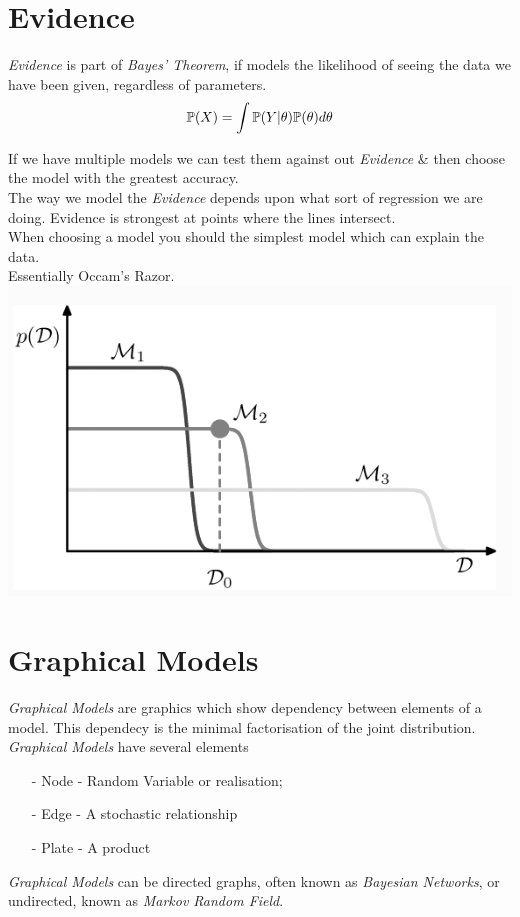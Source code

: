 \documentclass[11pt,a4paper]{article}
\begin{document}
\section{Evidence}

\textit{Evidence} is part of \textit{Bayes' Theorem}, if models the likelihood of seeing the data we have been given, regardless of parameters.
$$\mathbb{P}(X)=\int\mathbb{P}(Y|\theta)\mathbb{P}(\theta)d\theta$$

If we have multiple models we can test them against out \textit{Evidence} \& then choose the model with the greatest accuracy.\\

The way we model the \textit{Evidence} depends upon what sort of regression we are doing. Evidence is strongest at points where the lines intersect.\\

When choosing a model you should the simplest model which can explain the data.\\
\nb Essentially Occam's Razor.\\
\includegraphics[scale=.5]{img/mackay.png}

\section{Graphical Models}

\textit{Graphical Models} are graphics which show dependency between elements of a model. This dependecy is the minimal factorisation of the joint distribution. \textit{Graphical Models} have several elements
\begin{itemize}
	\item[-] Node - Random  Variable or realisation;
	\item[-] Edge - A stochastic relationship
	\item[-] Plate - A product
\end{itemize}
\textit{Graphical Models} can be directed graphs, often known as \textit{Bayesian Networks}, or undirected, known as \textit{Markov Random Field}.\\
\end{document}
